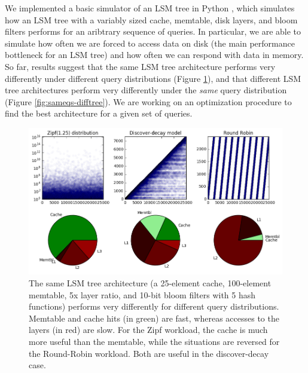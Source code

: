 \documentclass[11pt]{article}
\begin{document}
We implemented a basic simulator of an LSM tree in Python \citep{lsmulator},
which simulates how an LSM tree with a variably sized cache, memtable, disk
layers, and bloom filters performs for an aribtrary sequence of queries. In
particular, we are able to simulate how often we are forced to access data on
disk (the main performance bottleneck for an LSM tree) and how often we can
respond with data in memory. So far, results suggest that the same LSM tree
architecture performs very differently under different query distributions
(Figure \ref{fig:sametree-diffqs}), and that different LSM tree architectures
perform very differently under the \textit{same} query distribution (Figure
\ref{fig:sameqs-difftree}). We are working on an optimization procedure to find
the best architecture for a given set of queries.

\begin{figure}[!htb]
\begin{center}
\includegraphics[width=\textwidth]{sametree-diffqs.png}
\end{center}
\caption{The same LSM tree architecture (a 25-element cache, 100-element
memtable, 5x layer ratio, and 10-bit bloom filters with 5 hash functions)
performs very differently for different query distributions. Memtable and cache
hits (in green) are fast, whereas accesses to the layers (in red) are slow. For
the Zipf workload, the cache is much more useful than the memtable, while the
situations are reversed for the Round-Robin workload. Both are useful in the
discover-decay case.}
\label{fig:sametree-diffqs}
\end{figure}
\end{document}
